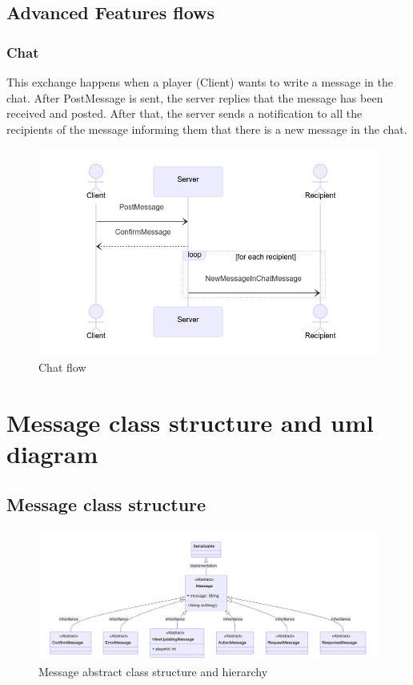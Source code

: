 \documentclass[12pt]{article}
\begin{document}
\subsection{Advanced Features flows}
\subsubsection{Chat}
This exchange happens when a player (Client) wants to write a message in the chat. After PostMessage is sent, the server replies that the message has been received and posted. After that, the server sends a notification to all the recipients of the message informing them that there is a new message in the chat.
\begin{figure}[H]
    \begin{center}
        \includegraphics[scale=0.29]{flow_chat.png}
        \caption{Chat flow}
    \end{center}
\end{figure}

\section{Message class structure and uml diagram}
\subsection{Message class structure}
\begin{figure}[H]
    \begin{center}
        \includegraphics[scale=0.2]{class_diagram_message_class.png}
        \caption{Message abstract class structure and hierarchy} 
    \end{center}
\end{figure}
\end{document}

